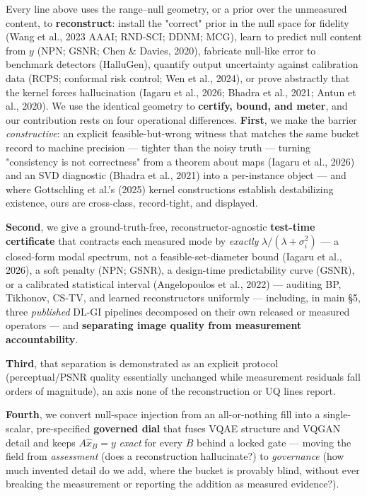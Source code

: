\documentclass[11pt]{article}
\begin{document}
Every line above uses the range--null geometry, or a prior over the unmeasured content, to \textbf{reconstruct}: install the "correct" prior in the null space for fidelity (Wang et al., 2023 AAAI; RND-SCI; DDNM; MCG), learn to predict null content from $y$ (NPN; GSNR; Chen \& Davies, 2020), fabricate null-like error to benchmark detectors (HalluGen), quantify output uncertainty against calibration data (RCPS; conformal risk control; Wen et al., 2024), or prove abstractly that the kernel forces hallucination (Iagaru et al., 2026; Bhadra et al., 2021; Antun et al., 2020). We use the identical geometry to \textbf{certify, bound, and meter}, and our contribution rests on four operational differences. \textbf{First}, we make the barrier \textit{constructive}: an explicit feasible-but-wrong witness that matches the same bucket record to machine precision --- tighter than the noisy truth --- turning "consistency is not correctness" from a theorem about maps (Iagaru et al., 2026) and an SVD diagnostic (Bhadra et al., 2021) into a per-instance object --- and where Gottschling et al.'s (2025) kernel constructions establish destabilizing existence, ours are cross-class, record-tight, and displayed.

\textbf{Second}, we give a ground-truth-free, reconstructor-agnostic \textbf{test-time certificate} that contracts each measured mode by \textit{exactly} $\lambda/(\lambda+\sigma_i^2)$ --- a closed-form modal spectrum, not a feasible-set-diameter bound (Iagaru et al., 2026), a soft penalty (NPN; GSNR), a design-time predictability curve (GSNR), or a calibrated statistical interval (Angelopoulos et al., 2022) --- auditing BP, Tikhonov, CS-TV, and learned reconstructors uniformly --- including, in main §5, three \textit{published} DL-GI pipelines decomposed on their own released or measured operators --- and \textbf{separating image quality from measurement accountability}.

\textbf{Third}, that separation is demonstrated as an explicit protocol (perceptual/PSNR quality essentially unchanged while measurement residuals fall orders of magnitude), an axis none of the reconstruction or UQ lines report.

\textbf{Fourth}, we convert null-space injection from an all-or-nothing fill into a single-scalar, pre-specified \textbf{governed dial} that fuses VQAE structure and VQGAN detail and keeps $A\hat{x}_B = y$ \textit{exact} for every $B$ behind a locked gate --- moving the field from \textit{assessment} (does a reconstruction hallucinate?) to \textit{governance} (how much invented detail do we add, where the bucket is provably blind, without ever breaking the measurement or reporting the addition as measured evidence?).
\end{document}
